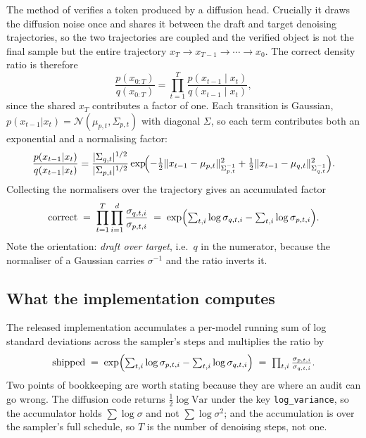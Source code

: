 The method of \citet{wang2025continuous} verifies a token produced by a diffusion head. Crucially it
draws the diffusion noise once and shares it between the draft and target denoising trajectories, so
the two trajectories are coupled and the verified object is not the final sample but the entire
trajectory $x_T \to x_{T-1} \to \cdots \to x_0$. The correct density ratio is therefore
\[
\frac{p(x_{0:T})}{q(x_{0:T})} = \prod_{t=1}^{T} \frac{p(x_{t-1} \mid x_t)}{q(x_{t-1} \mid x_t)} ,
\]
since the shared $x_T$ contributes a factor of one. Each transition is Gaussian,
$p(x_{t-1}|x_t) = \mathcal{N}(\mu_{p,t}, \Sigma_{p,t})$ with diagonal $\Sigma$, so each term
contributes both an exponential and a normalising factor:
\[
\frac{p(x_{t-1}|x_t)}{q(x_{t-1}|x_t)}
= \frac{|\Sigma_{q,t}|^{1/2}}{|\Sigma_{p,t}|^{1/2}}
  \exp\!\Bigl(-\tfrac{1}{2}\|x_{t-1}-\mu_{p,t}\|^2_{\Sigma_{p,t}^{-1}}
              +\tfrac{1}{2}\|x_{t-1}-\mu_{q,t}\|^2_{\Sigma_{q,t}^{-1}}\Bigr).
\]
Collecting the normalisers over the trajectory gives an accumulated factor
\begin{equation}
\text{correct} \;=\; \prod_{t=1}^{T} \prod_{i=1}^{d} \frac{\sigma_{q,t,i}}{\sigma_{p,t,i}}
\;=\; \exp\Bigl(\textstyle\sum_{t,i} \log \sigma_{q,t,i} - \sum_{t,i} \log \sigma_{p,t,i}\Bigr).
\label{eq:correct-factor}
\end{equation}
Note the orientation: \emph{draft over target}, i.e.\ $q$ in the numerator, because the normaliser of
a Gaussian carries $\sigma^{-1}$ and the ratio inverts it.

\subsection{What the implementation computes}

The released implementation accumulates a per-model running sum of log standard deviations across the
sampler's steps and multiplies the ratio by
\begin{equation}
\text{shipped} \;=\; \exp\Bigl(\textstyle\sum_{t,i}\log\sigma_{p,t,i} - \sum_{t,i}\log\sigma_{q,t,i}\Bigr)
\;=\; \prod_{t,i} \frac{\sigma_{p,t,i}}{\sigma_{q,t,i}} .
\label{eq:shipped-factor}
\end{equation}
Two points of bookkeeping are worth stating because they are where an audit can go wrong. The
diffusion code returns $\tfrac{1}{2}\log \mathrm{Var}$ under the key \texttt{log\_variance}, so the
accumulator holds $\sum \log \sigma$ and not $\sum\log\sigma^2$; and the accumulation is over the
sampler's full schedule, so $T$ is the number of denoising steps, not one.

